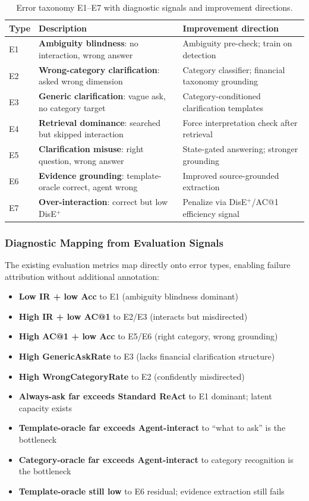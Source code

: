 \begin{table}[h]
\centering
\caption{Error taxonomy E1--E7 with diagnostic signals and improvement directions.}
\label{tab:errors}
\small
\begin{tabular}{p{}p{}p{}}
\toprule
Type & Description & Improvement direction \\
\midrule
E1 & \textbf{Ambiguity blindness}: no interaction, wrong answer
   & Ambiguity pre-check; train on detection \\
E2 & \textbf{Wrong-category clarification}: asked wrong dimension
   & Category classifier; financial taxonomy grounding \\
E3 & \textbf{Generic clarification}: vague ask, no category target
   & Category-conditioned clarification templates \\
E4 & \textbf{Retrieval dominance}: searched but skipped interaction
   & Force interpretation check after retrieval \\
E5 & \textbf{Clarification misuse}: right question, wrong answer
   & State-gated answering; stronger grounding \\
E6 & \textbf{Evidence grounding}: template-oracle correct, agent wrong
   & Improved source-grounded extraction \\
E7 & \textbf{Over-interaction}: correct but low DisE$^+$
   & Penalize via DisE$^+$/AC@1 efficiency signal \\
\bottomrule
\end{tabular}
\end{table}

\subsubsection{Diagnostic Mapping from Evaluation Signals}

The existing evaluation metrics map directly onto error types, enabling
failure attribution without additional annotation:

\begin{itemize}[leftmargin=*,noitemsep]
  \item \textbf{Low IR + low Acc} to E1 (ambiguity blindness dominant)
  \item \textbf{High IR + low AC@1} to E2/E3 (interacts but misdirected)
  \item \textbf{High AC@1 + low Acc} to E5/E6 (right category, wrong grounding)
  \item \textbf{High GenericAskRate} to E3 (lacks financial clarification structure)
  \item \textbf{High WrongCategoryRate} to E2 (confidently misdirected)
  \item \textbf{Always-ask far exceeds Standard ReAct} to E1 dominant; latent capacity exists
  \item \textbf{Template-oracle far exceeds Agent-interact} to ``what to ask'' is the bottleneck
  \item \textbf{Category-oracle far exceeds Agent-interact} to category recognition is the bottleneck
  \item \textbf{Template-oracle still low} to E6 residual; evidence extraction still fails
\end{itemize}

